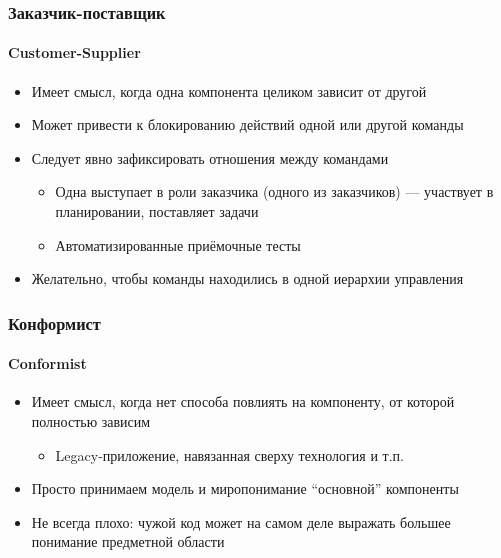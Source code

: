 \documentclass[xetex,mathserif,serif]{beamer}
\begin{document}
	\begin{frame}
		\frametitle{Заказчик-поставщик}
		\framesubtitle{Customer-Supplier}
		\begin{itemize}
			\item Имеет смысл, когда одна компонента целиком зависит от другой
			\item Может привести к блокированию действий одной или другой команды
			\item Следует явно зафиксировать отношения между командами
			\begin{itemize}
				\item Одна выступает в роли заказчика (одного из заказчиков) --- участвует в планировании, поставляет задачи
				\item Автоматизированные приёмочные тесты
			\end{itemize}
			\item Желательно, чтобы команды находились в одной иерархии управления
		\end{itemize}
	\end{frame}

	\begin{frame}
		\frametitle{Конформист}
		\framesubtitle{Conformist}
		\begin{itemize}
			\item Имеет смысл, когда нет способа повлиять на компоненту, от которой полностью зависим
			\begin{itemize}
				\item Legacy-приложение, навязанная сверху технология и т.п.
			\end{itemize}
			\item Просто принимаем модель и миропонимание ``основной'' компоненты
			\item Не всегда плохо: чужой код может на самом деле выражать большее понимание предметной области
		\end{itemize}
	\end{frame}
\end{document}

